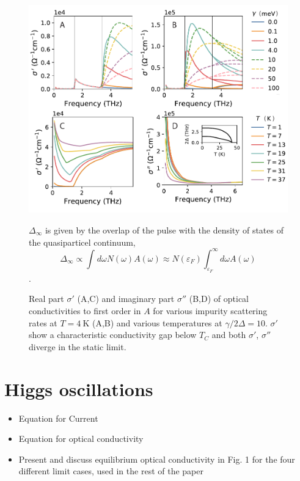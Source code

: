 \documentclass[aps,prb,reprint,noeprint,superscriptaddress]{revtex4-1}
\begin{document}
\begin{figure}[ht]
	\centering
	\includegraphics[width=\columnwidth]{figures/m-fig1.pdf}
	\caption{Real part $\sigma'$ (A,C) and imaginary part $\sigma''$ (B,D)
		of optical conductivities to first order in $A$ 
	for various impurity scattering rates at $T=\SI{4}{\kelvin}$ (A,B) and
various temperatures at $\gamma/2\Delta=10$. $\sigma'$ show a characteristic
conductivity gap below $T_C$ and both $\sigma'$, $\sigma''$ diverge in the
static limit.}
	
$\Delta_{\infty}$ is given by the overlap of the pulse with the density of
states of the quasiparticel continuum, 
$$\Delta_{\infty} \propto
\int_{}^{}d\omega N(\omega) A(\omega) \approx N(\varepsilon_F)
\int_{\varepsilon_F}^{\infty}d\omega A(\omega)$$.
\label{fig:singleband-gap}
\end{figure}

\section{Higgs oscillations}
\label{sec:higgs_oscillations}

\begin{itemize}
	\item Equation for Current
	\item Equation for optical conductivity
	\item Present and discuss equilibrium optical conductivity in Fig. 1 for the four different limit cases, used in the rest of the paper
\end{itemize}
\end{document}

